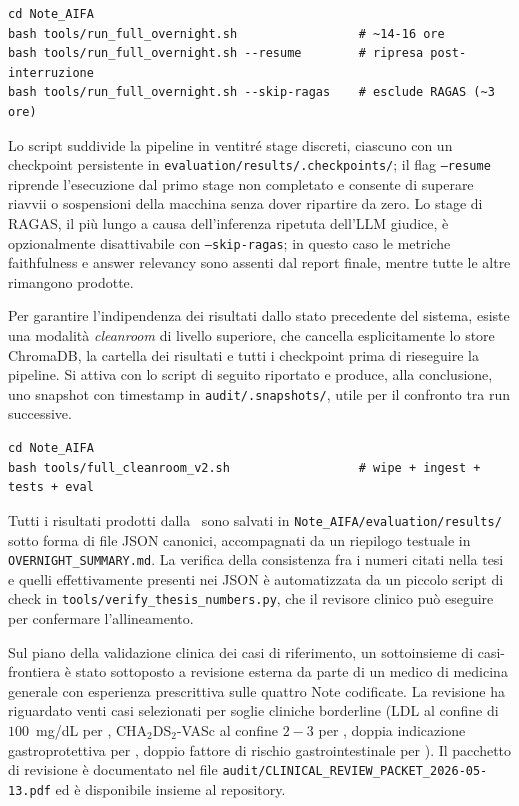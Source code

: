 {\footnotesize
\begin{verbatim}
cd Note_AIFA
bash tools/run_full_overnight.sh                 # ~14-16 ore
bash tools/run_full_overnight.sh --resume        # ripresa post-interruzione
bash tools/run_full_overnight.sh --skip-ragas    # esclude RAGAS (~3 ore)
\end{verbatim}
}

Lo script suddivide la pipeline in ventitré stage discreti, ciascuno con un checkpoint persistente in \texttt{evaluation/results/.checkpoints/}; il flag \texttt{--resume} riprende l'esecuzione dal primo stage non completato e consente di superare riavvii o sospensioni della macchina senza dover ripartire da zero. Lo stage di RAGAS, il più lungo a causa dell'inferenza ripetuta dell'LLM giudice, è opzionalmente disattivabile con \texttt{--skip-ragas}; in questo caso le metriche faithfulness e answer relevancy sono assenti dal report finale, mentre tutte le altre rimangono prodotte.

Per garantire l'indipendenza dei risultati dallo stato precedente del sistema, esiste una modalità \emph{cleanroom} di livello superiore, che cancella esplicitamente lo store ChromaDB, la cartella dei risultati e tutti i checkpoint prima di rieseguire la pipeline. Si attiva con lo script di seguito riportato e produce, alla conclusione, uno snapshot con timestamp in \texttt{audit/.snapshots/}, utile per il confronto tra run successive.

{\footnotesize
\begin{verbatim}
cd Note_AIFA
bash tools/full_cleanroom_v2.sh                  # wipe + ingest + tests + eval
\end{verbatim}
}

\begin{sloppypar}
Tutti i risultati prodotti dalla \cleanroomrun\ sono salvati in \texttt{Note\_AIFA/\allowbreak evaluation/\allowbreak results/} sotto forma di file JSON canonici, accompagnati da un riepilogo testuale in \texttt{OVERNIGHT\_\allowbreak SUMMARY.md}. La verifica della consistenza fra i numeri citati nella tesi e quelli effettivamente presenti nei JSON è automatizzata da un piccolo script di check in \texttt{tools/\allowbreak verify\_\allowbreak thesis\_\allowbreak numbers.py}, che il revisore clinico può eseguire per confermare l'allineamento.
\end{sloppypar}

Sul piano della validazione clinica dei casi di riferimento, un sottoinsieme di casi-frontiera è stato sottoposto a revisione esterna da parte di un medico di medicina generale con esperienza prescrittiva sulle quattro Note codificate. La revisione ha riguardato venti casi selezionati per soglie cliniche borderline (LDL al confine di $100$~mg/dL per \notetredici, CHA$_2$DS$_2$-VASc al confine $2{-}3$ per \notenova, doppia indicazione gastroprotettiva per \notezero, doppio fattore di rischio gastrointestinale per \notesessanta). Il pacchetto di revisione è documentato nel file \texttt{audit/CLINICAL\_REVIEW\_PACKET\_2026-05-13.pdf} ed è disponibile insieme al repository.

